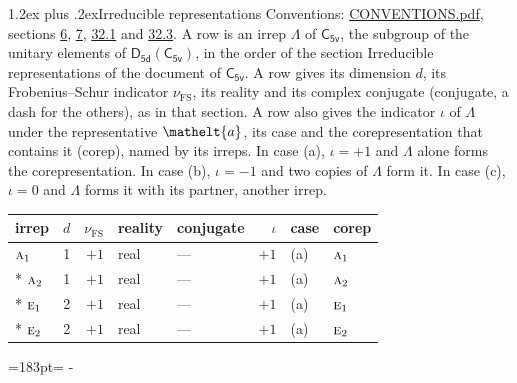 \documentclass[10pt,a4paper]{article}
\makeatletter
\renewcommand\section{\@startsection{section}{1}{\z@}{-3ex plus -1ex minus -.2ex}%
  {1.2ex plus .2ex}{\normalfont\large\sffamily\bfseries\color{parttitle}}}
\newcommand{\needspace}[1]{\par\penalty-100\begingroup\dimen0=#1\relax\dimen2=\pagegoal
  \advance\dimen2-\pagetotal\ifdim\dimen0>\dimen2\relax\ifdim\dimen2>0pt\vfil\break\fi\fi
  \endgroup}
\numberwithin{equation}{section}
\newcommand{\eltfont}[1]{{\let\sigma\eltsigma\mathelt{#1}}}
\newcommand{\grp}[1]{\mathsf{#1}}
\newcommand{\irr}[1]{\text{\normalfont\scshape #1}}
\newcommand{\elt}[1]{\eltfont{#1}}
\newcommand{\fsind}{\nu_{\mathrm{FS}}}
\makeatother
\begin{document}
\section{Irreducible representations}\label{s:irreps}
Conventions: \href{../../CONVENTIONS.pdf}{CONVENTIONS.pdf}, sections \href{../../../rotation/CONVENTIONS.pdf\#conv.6}{6}, \href{../../../rotation/CONVENTIONS.pdf\#conv.7}{7}, \href{../../CONVENTIONS.pdf\#conv.32.1}{32.1} and \href{../../CONVENTIONS.pdf\#conv.32.3}{32.3}.
\leavevmode\label{n:irrep.Delta}A row is an irrep $\Lambda$ of $\grp{C_{5v}}$, the subgroup of the unitary elements of $\grp{D_{5d}}(\grp{C_{5v}})$, in the order of the section Irreducible representations of the document of \href{../../../rotation/data/pdf/C5v.pdf}{$\grp{C_{5v}}$}. \label{n:index.dimension}\label{n:index.frobenius}\label{n:head.irrep}\label{n:head.reality}\label{n:head.conjugate}A row gives its dimension $d$, its Frobenius--Schur indicator $\fsind$, its reality and its complex conjugate (conjugate, a dash for the others), as in that section. \label{n:head.case.corep}\label{n:head.corep}A row also gives the indicator $\iota$ of $\Lambda$ under the representative $\elt{a}$, its case and the corepresentation that contains it (corep), named by its irreps. In case (a), $\iota = +1$ and $\Lambda$ alone forms the corepresentation. In case (b), $\iota = -1$ and two copies of $\Lambda$ form it. In case (c), $\iota = 0$ and $\Lambda$ forms it with its partner, another irrep.
\setlength{\emergencystretch}{2em}\par\setlength{\emergencystretch}{0pt}
{\small\renewcommand{\arraystretch}{1.25}\setlength{\tabcolsep}{4pt}\begin{longtable}{@{}lrrllrll@{}}\toprule
irrep & $d$ & $\fsind$ & reality & conjugate & $\iota$ & case & corep\\\midrule\endhead
\bottomrule\endfoot\endlastfoot
$\irr{a}_{1}$ & 1 & $+1$ & real & --- & $+1$ & (a) & $\irr{a}_{1}$\\*
$\irr{a}_{2}$ & 1 & $+1$ & real & --- & $+1$ & (a) & $\irr{a}_{2}$\\*
$\irr{e}_{1}$ & 2 & $+1$ & real & --- & $+1$ & (a) & $\irr{e}_{1}$\\*
$\irr{e}_{2}$ & 2 & $+1$ & real & --- & $+1$ & (a) & $\irr{e}_{2}$\\
\bottomrule\end{longtable}}
\needspace{183pt}
\end{document}
